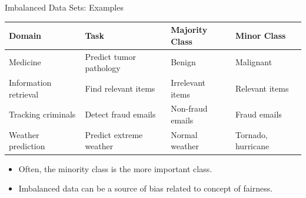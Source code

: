 \documentclass[11pt,compress,t,notes=noshow, xcolor=table]{beamer}
\begin{document}
\begin{frame}{Imbalanced Data Sets: Examples}
    \small
    \begin{table}[h]
        \scriptsize
        \centering
        \begin{tabular}{llll}
            \toprule
            \textbf{Domain} & \textbf{Task} & \textbf{Majority Class} & \textbf{Minor Class} \\ [5pt]
            \hline
            Medicine & Predict tumor pathology & Benign &  Malignant \\ [5pt]
            Information retrieval & Find relevant items & Irrelevant items & Relevant items \\ [5pt]
            Tracking criminals & Detect fraud emails & Non-fraud emails & Fraud emails \\ [5pt]
            Weather prediction & Predict extreme weather & Normal weather & Tornado, hurricane \\
            \hline
        \end{tabular}
    \end{table}
    
	\begin{itemize}
        \item Often, the minority class is the more important class.
        \item Imbalanced data can be a source of bias related to concept of fairness. %
	\end{itemize}

\end{frame}
\end{document}

